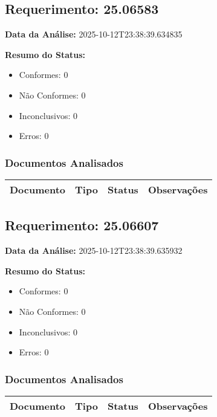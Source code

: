 \documentclass[12pt,a4paper]{article}
\begin{document}
\subsection{Requerimento: 25.06583}

\textbf{Data da Análise:} 2025-10-12T23:38:39.634835

\textbf{Resumo do Status:}
\begin{itemize}
    \item Conformes: 0
    \item Não Conformes: 0
    \item Inconclusivos: 0
    \item Erros: 0
\end{itemize}

\subsubsection{Documentos Analisados}

\begin{longtable}{|p{4cm}|p{2cm}|p{2cm}|p{6cm}|}
\hline
\textbf{Documento} & \textbf{Tipo} & \textbf{Status} & \textbf{Observações} \\
\hline
\endhead
\end{longtable}


\subsection{Requerimento: 25.06607}

\textbf{Data da Análise:} 2025-10-12T23:38:39.635932

\textbf{Resumo do Status:}
\begin{itemize}
    \item Conformes: 0
    \item Não Conformes: 0
    \item Inconclusivos: 0
    \item Erros: 0
\end{itemize}

\subsubsection{Documentos Analisados}

\begin{longtable}{|p{4cm}|p{2cm}|p{2cm}|p{6cm}|}
\hline
\textbf{Documento} & \textbf{Tipo} & \textbf{Status} & \textbf{Observações} \\
\hline
\endhead
\end{longtable}
\end{document}
